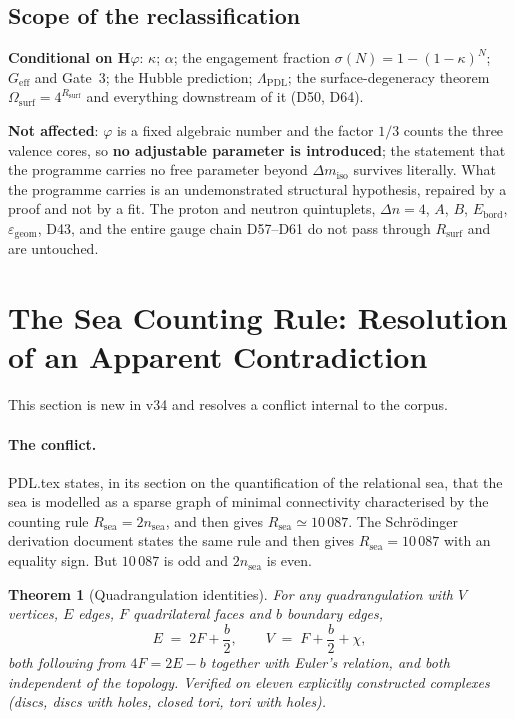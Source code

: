 \documentclass[11pt,a4paper]{article}
\newcommand{\Rsea}{R_{\mathrm{sea}}}
\theoremstyle{plain}
\newtheorem{theorem}{Theorem}[section]
\theoremstyle{definition}
\theoremstyle{remark}
\newcommand{\Geff}{G_{\mathrm{eff}}}
\newcommand{\Rsurf}{R_{\mathrm{surf}}}
\newcommand{\sigmaN}{\sigma(N)}
\begin{document}
\subsection{Scope of the reclassification}
\label{subsec:Hphiscope}
\textbf{Conditional on H$\varphi$}: $\kappa$; $\alpha$; the engagement fraction $\sigmaN=1-(1-\kappa)^N$; $\Geff$ and Gate~3; the Hubble prediction; $\Lambda_{\mathrm{PDL}}$; the surface-degeneracy theorem $\Omega_{\mathrm{surf}}=4^{\Rsurf}$ and everything downstream of it (D50, D64).

\textbf{Not affected}: $\varphi$ is a fixed algebraic number and the factor $1/3$ counts the three valence cores, so \textbf{no adjustable parameter is introduced}; the statement that the programme carries no free parameter beyond $\Delta m_{\mathrm{iso}}$ survives literally. What the programme carries is an undemonstrated structural hypothesis, repaired by a proof and not by a fit. The proton and neutron quintuplets, $\Delta n=4$, $A$, $B$, $E_{\mathrm{bord}}$, $\varepsilon_{\mathrm{geom}}$, D43, and the entire gauge chain D57--D61 do not pass through $\Rsurf$ and are untouched.

\section{The Sea Counting Rule: Resolution of an Apparent Contradiction}
\label{sec:searule}

This section is new in v34 and resolves a conflict internal to the corpus.

\paragraph{The conflict.} PDL.tex states, in its section on the quantification of the relational sea, that the sea is modelled as a sparse graph of minimal connectivity characterised by the counting rule $\Rsea=2n_{\mathrm{sea}}$, and then gives $\Rsea\simeq 10\,087$. The Schrödinger derivation document states the same rule and then gives $\Rsea=10\,087$ with an equality sign. But $10\,087$ is odd and $2n_{\mathrm{sea}}$ is even.

\begin{theorem}[Quadrangulation identities]
\label{thm:quad}
For any quadrangulation with $V$ vertices, $E$ edges, $F$ quadrilateral faces and $b$ boundary edges,
\[
E \;=\; 2F + \frac{b}{2}, \qquad V \;=\; F + \frac{b}{2} + \chi ,
\]
both following from $4F=2E-b$ together with Euler's relation, and both independent of the topology. Verified on eleven explicitly constructed complexes (discs, discs with holes, closed tori, tori with holes).
\end{theorem}
\end{document}
